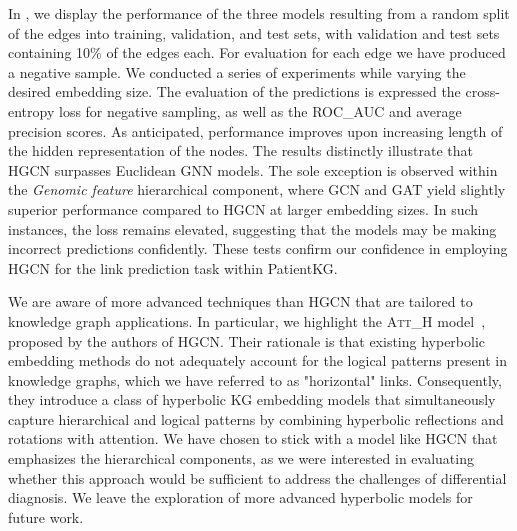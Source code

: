 In , we display the performance of the three models resulting from a random split of the edges into training, validation, and test sets, with validation and test sets containing 10\% of the edges each. For evaluation for each edge we have produced a negative sample. We conducted a series of experiments while varying the desired embedding size. The evaluation of the predictions is expressed the cross-entropy loss for negative sampling, as well as the ROC\_AUC and average precision scores. As anticipated, performance improves upon increasing length of the hidden representation of the nodes. The results distinctly illustrate that HGCN surpasses Euclidean GNN models. The sole exception is observed within the \emph{Genomic feature} hierarchical component, where GCN and GAT yield slightly superior performance compared to HGCN at larger embedding sizes. In such instances, the loss remains elevated, suggesting that the models may be making incorrect predictions confidently. These tests confirm our confidence in employing HGCN for the link prediction task within PatientKG.


We are aware of more advanced techniques than HGCN that are tailored to knowledge graph applications. In particular, we highlight the \textsc{Att\_H} model~\cite{chami2020lowDimensionalHyperbolicKnowledgeGraphEmbeddings}, proposed by the authors of HGCN. Their rationale is that existing hyperbolic embedding methods do not adequately account for the logical patterns present in knowledge graphs, which we have referred to as "horizontal" links. Consequently, they introduce a class of hyperbolic KG embedding models that simultaneously capture hierarchical and logical patterns by combining hyperbolic reflections and rotations with attention. We have chosen to stick with a model like HGCN that emphasizes the hierarchical components, as we were interested in evaluating whether this approach would be sufficient to address the challenges of differential diagnosis. We leave the exploration of more advanced hyperbolic models for future work.

